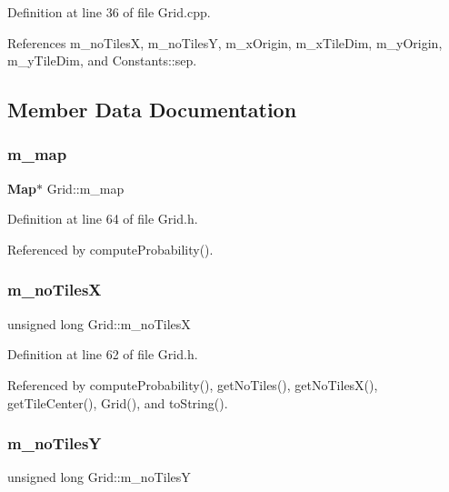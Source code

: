 Definition at line 36 of file Grid.\+cpp.



References m\+\_\+no\+TilesX, m\+\_\+no\+TilesY, m\+\_\+x\+Origin, m\+\_\+x\+Tile\+Dim, m\+\_\+y\+Origin, m\+\_\+y\+Tile\+Dim, and Constants\+::sep.



\subsection{Member Data Documentation}
\mbox{\label{class_grid_ac3caf5a02341f2cfb809c90bd5deeee3}} 
\subsubsection{m\+\_\+map}
{\footnotesize\ttfamily \textbf{ Map}$\ast$ Grid\+::m\+\_\+map\hspace{0.3cm}{\ttfamily [private]}}



Definition at line 64 of file Grid.\+h.



Referenced by compute\+Probability().

\mbox{\label{class_grid_a177bfdc70436c25a1510d1abe19e34c1}} 
\subsubsection{m\+\_\+no\+TilesX}
{\footnotesize\ttfamily unsigned long Grid\+::m\+\_\+no\+TilesX\hspace{0.3cm}{\ttfamily [private]}}



Definition at line 62 of file Grid.\+h.



Referenced by compute\+Probability(), get\+No\+Tiles(), get\+No\+Tiles\+X(), get\+Tile\+Center(), Grid(), and to\+String().

\mbox{\label{class_grid_a8fe14c4781dfd5623922fcc1f9c10130}} 
\subsubsection{m\+\_\+no\+TilesY}
{\footnotesize\ttfamily unsigned long Grid\+::m\+\_\+no\+TilesY\hspace{0.3cm}{\ttfamily [private]}}



